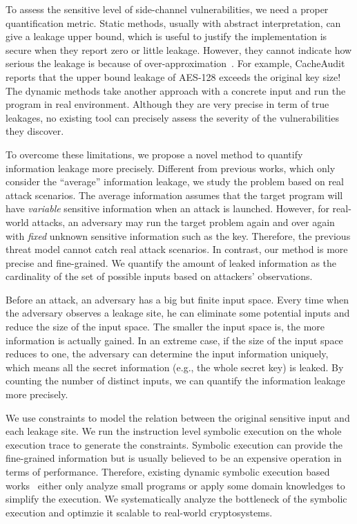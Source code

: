 To assess the sensitive level of side-channel vulnerabilities, we need a proper 
quantification metric.
Static methods, usually with abstract interpretation, can give a leakage upper bound, 
which is useful to justify the implementation is secure when they report zero or little leakage. 
However, they cannot indicate how serious the leakage is because of over-approximation~\cite{xxx}. 
For example, CacheAudit~\cite{xxx} reports that the upper bound leakage of AES-128 exceeds 
the original key size! The dynamic methods take another approach with a concrete input and 
run the program in real environment. Although they are very precise in term of true leakages, 
no existing tool can precisely assess the severity of the vulnerabilities they discover.

To overcome these limitations, we propose a novel method
to quantify information leakage more precisely. 
Different from previous works, which only consider the
``average'' information leakage, we study the problem based on real attack scenarios.
The average information assumes that the target program will have \emph{variable} sensitive 
information when an attack is launched.
However, for real-world attacks, an adversary may run the target problem again and over again 
with \emph{fixed} unknown sensitive information such as the key. 
Therefore, the previous threat model cannot catch real attack scenarios.
In contrast, our method is more precise and fine-grained. 
We quantify the amount of leaked information as the cardinality of the set of 
possible inputs based on attackers' observations. 

Before an attack, an adversary has a big but finite input space.
Every time when the adversary observes a leakage site, he can eliminate some 
potential inputs and reduce the size of the input space. 
The smaller the input space is, the more information is actually gained. 
In an extreme case, if the size of the input space reduces to one, 
the adversary can determine the input information uniquely, which means all the secret information
(e.g., the whole secret key) is leaked. By counting the number of distinct inputs, 
we can quantify the information leakage more precisely. 

We use constraints to model the relation between the original sensitive input and
each leakage site. We run the instruction level symbolic execution on the whole
execution trace to generate the constraints. Symbolic execution can provide the fine-grained
information but is usually believed to be an expensive operation in terms of performance. 
Therefore, existing dynamic symbolic execution based works~\cite{xxx} either only analyze 
small programs or apply some domain knowledges to simplify the execution. We systematically
analyze the bottleneck of the symbolic execution and optimzie it scalable to
real-world cryptosystems. 

